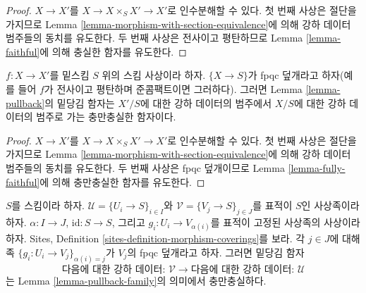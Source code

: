 \begin{proof}
$X \to X'$를 $X \to X \times_S X' \to X'$로 인수분해할 수 있다.
첫 번째 사상은 절단을 가지므로 Lemma
\ref{lemma-morphism-with-section-equivalence}에 의해 강하 데이터
범주들의 동치를 유도한다. 두 번째 사상은 전사이고 평탄하므로 Lemma
\ref{lemma-faithful}에 의해 충실한 함자를 유도한다.
\end{proof}

\begin{lemma}
\label{lemma-morphism-source-fpqc-covering}
$f : X \to X'$를 밑스킴 $S$ 위의 스킴 사상이라 하자.
$\{X \to S\}$가 fpqc 덮개라고 하자(예를 들어 $f$가 전사이고 평탄하며
준콤팩트이면 그러하다). 그러면 Lemma \ref{lemma-pullback}의 밑당김
함자는 $X'/S$에 대한 강하 데이터의 범주에서 $X/S$에 대한 강하
데이터의 범주로 가는 충만충실한 함자이다.
\end{lemma}

\begin{proof}
$X \to X'$를 $X \to X \times_S X' \to X'$로 인수분해할 수 있다.
첫 번째 사상은 절단을 가지므로 Lemma
\ref{lemma-morphism-with-section-equivalence}에 의해 강하 데이터
범주들의 동치를 유도한다. 두 번째 사상은 fpqc 덮개이므로 Lemma
\ref{lemma-fully-faithful}에 의해 충만충실한 함자를 유도한다.
\end{proof}

\begin{lemma}
\label{lemma-fpqc-refinement-coverings-fully-faithful}
$S$를 스킴이라 하자. $\mathcal{U} = \{U_i \to S\}_{i \in I}$와
$\mathcal{V} = \{V_j \to S\}_{j \in J}$를 표적이 $S$인 사상족이라
하자. $\alpha : I \to J$, $\text{id} : S \to S$, 그리고
$g_i : U_i \to V_{\alpha(i)}$를 표적이 고정된 사상족의 사상이라 하자.
Sites, Definition \ref{sites-definition-morphism-coverings}를 보라.
각 $j \in J$에 대해 족 $\{g_i : U_i \to V_j\}_{\alpha(i) = j}$가
$V_j$의 fpqc 덮개라고 하자. 그러면 밑당김 함자
$$
\text{다음에 대한 강하 데이터: }
\mathcal{V}
\longrightarrow
\text{다음에 대한 강하 데이터: }
\mathcal{U}
$$
는 Lemma \ref{lemma-pullback-family}의 의미에서 충만충실하다.
\end{lemma}

